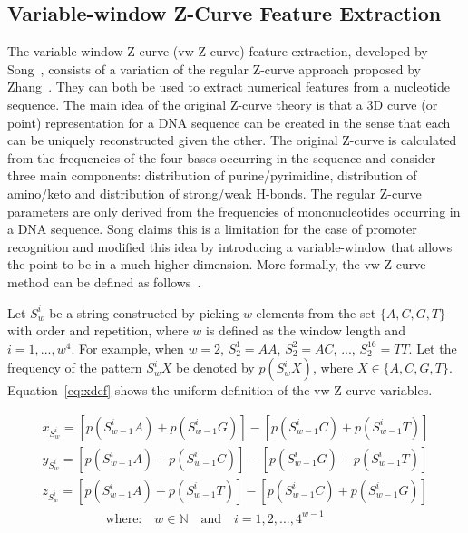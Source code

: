 \documentclass[runningheads,a4paper]{llncs}
\begin{document}
 

\subsection{Variable-window Z-Curve Feature Extraction}

The variable-window Z-curve (vw Z-curve) feature extraction, developed by Song~\cite{song2011}, consists of a variation of the regular Z-curve approach proposed by Zhang~\cite{zhang1997}. They can both be  used to extract numerical features from a nucleotide sequence. The main idea of the original Z-curve theory is that a 3D curve (or point) representation for a DNA sequence can be created in the sense that each can be uniquely reconstructed given the other. The original Z-curve is calculated from the frequencies of the four bases occurring in the sequence and consider three main components: distribution of purine/pyrimidine, distribution of amino/keto and distribution of strong/weak H-bonds. The regular Z-curve parameters are only derived from the frequencies of mononucleotides occurring in a DNA sequence. Song claims this is a limitation for the case of  promoter recognition and  modified this idea by introducing a variable-window that allows the point to be in a much higher dimension.  More formally, the vw Z-curve method  can be defined as follows~\cite{song2011}.

Let $ S_{w}^{i} $ be a string constructed by picking $ w $ elements from the set $ \{A,C,G,T\} $ with order and repetition, where $ w $ is defined as the window length and $ i = 1, ..., w^{4} $. For example, when $ w = 2 $, $ S_{2}^{1} = AA $, $ S_{2}^{2} = AC $, ..., $ S_{2}^{16} = TT $. Let the frequency of the pattern $ S_{w}^{i}X $ be denoted by $ p\left(S_{w}^{i}X\right) $, where $ X \in \{A,C,G,T\} $. Equation~\ref{eq:xdef} shows the uniform definition of the vw Z-curve variables.

\begin{equation}
    \begin{array}{l}
        \displaystyle  x_{S_{w}^{i}} = [p\left(S_{w-1}^{i}A\right) + p\left(S_{w-1}^{i}G\right)] - 
                                       [p\left(S_{w-1}^{i}C\right) + p\left(S_{w-1}^{i}T\right)] \\
        \displaystyle  y_{S_{w}^{i}} = [p\left(S_{w-1}^{i}A\right) + p\left(S_{w-1}^{i}C\right)] - 
                                       [p\left(S_{w-1}^{i}G\right) + p\left(S_{w-1}^{i}T\right)] \\
        \displaystyle  z_{S_{w}^{i}} = [p\left(S_{w-1}^{i}A\right) + p\left(S_{w-1}^{i}T\right)] - 
                                       [p\left(S_{w-1}^{i}C\right) + p\left(S_{w-1}^{i}G\right)] \\
        \displaystyle  \quad\quad\quad\quad\quad \text{where:} \quad w \in \mathbb{N} \quad \text{and} \quad i = 1, 2, ..., 4^{w-1} \\
    \end{array} 
    \label{eq:xdef}
\end{equation}
\end{document}
